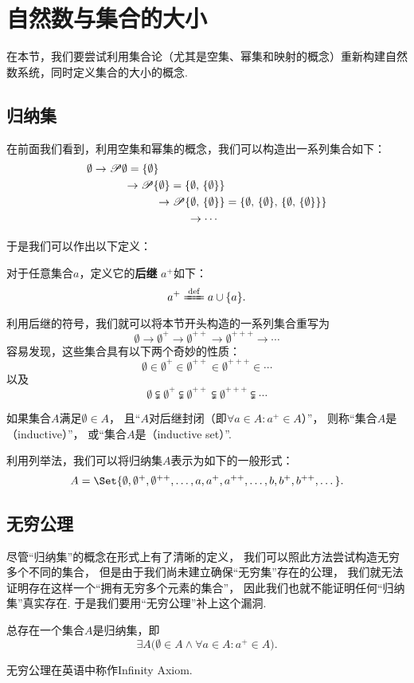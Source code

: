 \section{自然数与集合的大小}
在本节，我们要尝试利用集合论（尤其是空集、幂集和映射的概念）重新构建自然数系统，同时定义集合的大小的概念.

\subsection{归纳集}
在前面我们看到，利用空集和幂集的概念，我们可以构造出一系列集合如下：
\[\begin{aligned}
\emptyset
&\to
\Powerset\emptyset = \NaturalSet{1} \\
&\hspace{1cm}\to
\Powerset\NaturalSet{1} = \NaturalSet{2} \\
&\hspace{2cm}\to
\Powerset\NaturalSet{2} = \NaturalSet{3} \\
&\hspace{3cm}\to
\dotsb
\end{aligned}\]

于是我们可以作出以下定义：
\begin{definition}[后继]\label{definition:集合论.后继的定义}
对于任意集合\(a\)，定义它的\textbf{后继} \(a^+\)如下：\[
a^+ \defeq a \cup \{a\}.
\]
\end{definition}
利用后继的符号，我们就可以将本节开头构造的一系列集合重写为\[
\emptyset
\to \emptyset^+
\to \emptyset^{++}
\to \emptyset^{+++}
\to \dotsb
\]容易发现，这些集合具有以下两个奇妙的性质：\[
\emptyset
\in \emptyset^+
\in \emptyset^{++}
\in \emptyset^{+++}
\in \dotsb
\]以及\[
\emptyset
\subsetneqq \emptyset^+
\subsetneqq \emptyset^{++}
\subsetneqq \emptyset^{+++}
\subsetneqq \dotsb
\]

\begin{definition}[归纳集]\label{definition:集合论.归纳集的定义}
如果集合\(A\)满足\(\emptyset \in A\)，%
且“\(A\)对后继封闭（即\(\forall a \in A : a^+ \in A\)）”，%
则称“集合\(A\)是（inductive）”，%
或“集合\(A\)是（inductive set）”.
\end{definition}
利用列举法，我们可以将归纳集\(A\)表示为如下的一般形式：\[
A = \Set{
 \emptyset, \emptyset^+, \emptyset^{++}, \dotsc,
 a, a^+, a^{++}, \dotsc,
 b, b^+, b^{++}, \dotsc
}.
\]

\subsection{无穷公理}
尽管“归纳集”的概念在形式上有了清晰的定义，%
我们可以照此方法尝试构造无穷多个不同的集合，%
但是由于我们尚未建立确保“无穷集”存在的公理，%
我们就无法证明存在这样一个“拥有无穷多个元素的集合”，%
因此我们也就不能证明任何“归纳集”真实存在.
于是我们要用“无穷公理”补上这个漏洞.
\begin{axiom}[无穷公理]
总存在一个集合\(A\)是归纳集，即\[
\exists A \bigl(
  \emptyset \in A
  \land
  \forall a \in A : a^+ \in A
\bigr).
\]
\end{axiom}
无穷公理在英语中称作Infinity Axiom.

